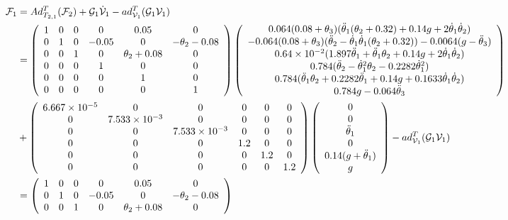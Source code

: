\documentclass[]{scrreprt}
\newcommand{\myvec}[1]{\left(\begin{array}{c}#1\end{array}\right)}
\begin{document}
\begin{align*}
\mathcal{F}_1 &= Ad_{T_{2,1}}^T(\mathcal{F}_{2})+\mathcal{G}_1\dot{\mathcal{V}}_1-ad_{\mathcal{V}_1}^T(\mathcal{G}_1\mathcal{V}_1)\\
&= \left(\begin{array}{cccccc}
1 & 0 & 0 & 0 & 0.05 & 0 \\
0 & 1 & 0 & -0.05 & 0 & -\theta_2-0.08 \\
0 & 0 & 1 & 0 & \theta_2+0.08 & 0 \\
0 & 0 & 0 & 1 & 0 & 0 \\
0 & 0 & 0 & 0 & 1 & 0 \\
0 & 0 & 0 & 0 & 0 & 1
\end{array}\right)\myvec{0.064(0.08+\theta_3)(\tddot{1}(\theta_2+0.32)+0.14g+2\tdot{1}\tdot{2})  \\
	-0.064(0.08+\theta_3)(\tddot{2}-\tdot{1}\tdot{1}(\theta_2+0.32))-0.0064(g-\tddot{3})\\	
	\num{0.64e-2}(1.897\tddot{1}+\tddot{1}\theta_2+0.14g+2\tdot{1}\tdot{2})\\
	0.784(\tddot{2}-\tdot{1}^2\theta_2-0.2282\tdot{1}^2)\\
	0.784(\tddot{1}\theta_2+0.2282\tddot{1}+0.14g+0.1633\tdot{1}\tdot{2})\\
	0.784g-0.064\tddot{3}}\\
&+
\left(
\begin{array}{ccccccc}
\num{+6.667e-5} & \num{0} & \num{0} & 0 & 0 & 0\\
\num{0} & \num{+7.533e-3} & \num{0} & 0 & 0 & 0\\
\num{0} & \num{0} & \num{+7.533e-3} & 0 & 0 & 0\\
0 & 0 & 0 & 1.2 & 0 & 0\\
0 & 0 & 0 & 0 & 1.2 & 0\\
0 & 0 & 0 & 0 & 0 & 1.2
\end{array}
\right)\myvec{0\\0\\\ddot{\theta}_1\\0\\0.14(g+\ddot{\theta}_1)\\ g}-ad_{\mathcal{V}_1}^T(\mathcal{G}_1\mathcal{V}_1)\\
&= \left(\begin{array}{cccccc}
1 & 0 & 0 & 0 & 0.05 & 0 \\
0 & 1 & 0 & -0.05 & 0 & -\theta_2-0.08 \\
0 & 0 & 1 & 0 & \theta_2+0.08 & 0 \\
\end{array}\right)

\end{align*}
\end{document}
